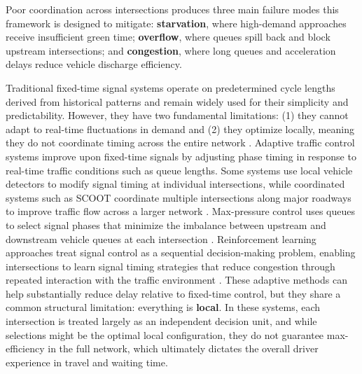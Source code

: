 \documentclass[12pt]{article}
\begin{document}
Poor coordination across intersections produces three main failure modes this framework is designed to mitigate: \textbf{starvation}, where high-demand approaches receive insufficient green time; \textbf{overflow}, where queues spill back and block upstream intersections; and \textbf{congestion}, where long queues and acceleration delays reduce vehicle discharge efficiency.

Traditional fixed-time signal systems operate on predetermined cycle lengths derived from historical patterns and remain widely used for their simplicity and predictability. However, they have two fundamental limitations: (1) they cannot adapt to real-time fluctuations in demand and (2) they optimize locally, meaning they do not coordinate timing across the entire network \cite{roess2019}. Adaptive traffic control systems improve upon fixed-time signals by adjusting phase timing in response to real-time traffic conditions such as queue lengths. Some systems use local vehicle detectors to modify signal timing at individual intersections, while coordinated systems such as SCOOT coordinate multiple intersections along major roadways to improve traffic flow across a larger network \cite{hunt1981}. Max-pressure control uses queues to select signal phases that minimize the imbalance between upstream and downstream vehicle queues at each intersection \cite{varaiya2013}. Reinforcement learning approaches treat signal control as a sequential decision-making problem, enabling intersections to learn signal timing strategies that reduce congestion through repeated interaction with the traffic environment \cite{genders2016,wei2018}. These adaptive methods can help substantially reduce delay relative to fixed-time control, but they share a common structural limitation: everything is \textbf{local}. In these systems, each intersection is treated largely as an independent decision unit, and while selections might be the optimal local configuration, they do not guarantee max-efficiency in the full network, which ultimately dictates the overall driver experience in travel and waiting time.
\end{document}
